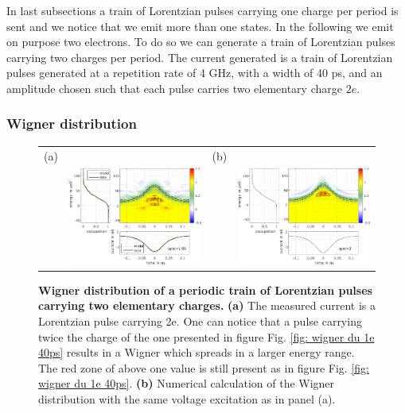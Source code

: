 In last subsections a train of Lorentzian pulses carrying one charge per period is sent and we notice that we emit more than one states. 
In the following we emit on purpose two electrons.
To do so we can generate a train of Lorentzian pulses carrying two charges per period.
The current generated is a train of Lorentzian pulses generated at a repetition rate of 4 GHz, with a width of 40 ps, and an amplitude chosen such that each pulse carries two elementary charge $2e$.

\subsubsection*{Wigner distribution}

\begin{figure}[hpbt]
	\begin{center}
		\begin{tabular}{c c c c}
	
		(a) & & (b) &  \\ 
		& \includegraphics[width = 6cm]{./chap1/wigData_leviton_40ps_2e_51mK_Projected_Gradient_Method}&
		& \includegraphics[width = 6cm]{./chap1/wigTheory_leviton_40ps_2e_50mK}
		\end{tabular} 
	\end{center}
	\caption{\textbf{Wigner distribution of a periodic train of Lorentzian pulses carrying two elementary charges.} \textbf{(a)} The measured current is a Lorentzian pulse carrying 2e.
	One can notice that a pulse carrying twice the charge of the one presented in figure Fig. \ref{fig: wigner du 1e 40ps} results in a Wigner which spreads in a larger energy range.
	The red zone of above one value is still present as in figure Fig. \ref{fig: wigner du 1e 40ps}. 
	 \textbf{(b)} Numerical calculation of the Wigner distribution with the same voltage excitation as in panel (a).}
	\label{fig: wigner du 2e 40ps}
\end{figure}

